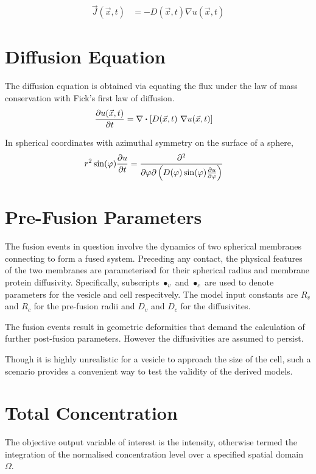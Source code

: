 \documentclass{report}
\newcommand\Par[1]{{ \left({#1}\right) }}
\newcommand\Brack[1]{{ \left[{#1}\right] }}
\begin{document}
\begin{align*}
	\vec{J}(\vec{x}, t) &= -D(\vec{x}, t) \nabla{u(\vec{x}, t)}
\end{align*}

\section{Diffusion Equation}
The diffusion equation is obtained via equating the flux under the law of mass conservation with Fick's first law of diffusion.
\begin{align*}
	\pdv{u(\vec{x}, t)}{t} &= \nabla \dotproduct \Brack{D(\vec{x}, t)\ \nabla{u(\vec{x}, t)}}
\end{align*}

In spherical coordinates with azimuthal symmetry on the surface of a sphere,
\begin{align*}
	r^2 \sin(\varphi) \pdv{u}{t} &= \pdv{}{\varphi}\Par{D(\varphi) \sin(\varphi) \pdv{u}{\varphi}}
\end{align*}

\section{Pre-Fusion Parameters}
The fusion events in question involve the dynamics of two spherical membranes connecting to form a fused system. Preceding any contact, the physical features of the two membranes are parameterised for their spherical radius and membrane protein diffusivity. Specifically, subscripts $\bullet_v$ and $\bullet_c$ are used to denote parameters for the vesicle and cell respecitvely. The model input constants are $R_v$ and $R_c$ for the pre-fusion radii and $D_v$ and $D_c$ for the diffusivites.

The fusion events result in geometric deformities that demand the calculation of further post-fusion parameters. However the diffusivities are assumed to persist.

Though it is highly unrealistic for a vesicle to approach the size of the cell, such a scenario provides a convenient way to test the validity of the derived models.

\section{Total Concentration}
The objective output variable of interest is the intensity, otherwise termed the integration of the normalised concentration level over a specified spatial domain $\Omega$.
\end{document}
